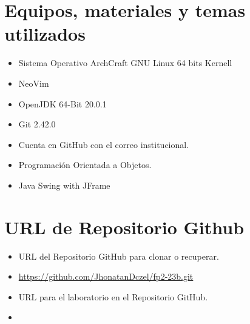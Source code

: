 	\section{Equipos, materiales y temas utilizados}
	\begin{itemize}
		\item Sistema Operativo ArchCraft GNU Linux 64 bits Kernell
		\item NeoVim
		\item OpenJDK 64-Bit 20.0.1 
		\item Git 2.42.0
		\item Cuenta en GitHub con el correo institucional.
		\item Programación Orientada a Objetos.
    \item Java Swing with JFrame
	\end{itemize}
	\section{URL de Repositorio Github}
	\begin{itemize}
            \item URL del Repositorio GitHub para clonar o recuperar.
            \item \url{https://github.com/JhonatanDczel/fp2-23b.git}
            \item URL para el laboratorio \itemPracticeNumber{} en el Repositorio GitHub.
            \item \itemUrl
	\end{itemize}
